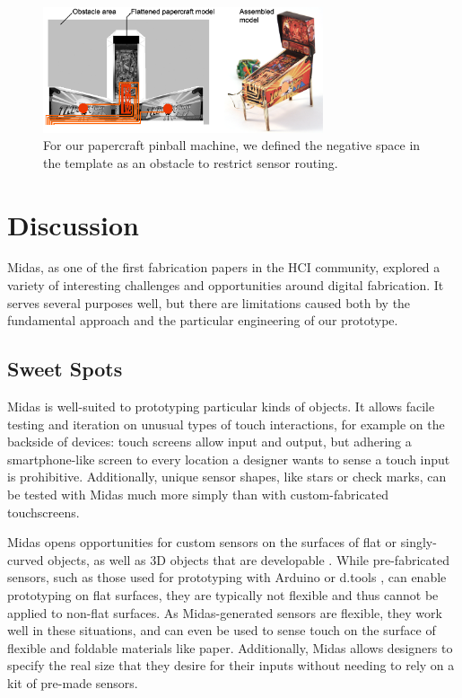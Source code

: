 \begin{figure}
\centering
\includegraphics[width=3.25in]{figures/midas/pinball-horizontal.png}
\caption{For our papercraft pinball machine, we defined the negative space in the template as an obstacle to restrict sensor routing.} 
\label{fig:midas-pinball}
\end{figure}


\section{Discussion}

    Midas, as one of the first fabrication papers in the HCI community, explored a variety of interesting challenges and opportunities around digital fabrication. It serves several purposes well, but there are limitations caused both by the fundamental approach and the particular engineering of our prototype.

    \subsection{Sweet Spots}
    
    Midas is well-suited to prototyping particular kinds of objects. It allows facile testing and iteration on unusual types of touch interactions, for example on the backside of devices: touch screens allow input and output, but adhering a smartphone-like screen to every location a designer wants to sense a touch input is prohibitive. Additionally, unique sensor shapes, like stars or check marks, can be tested with Midas much more simply than with custom-fabricated touchscreens.
    
    Midas opens opportunities for custom sensors on the surfaces of flat or singly-curved objects, as well as 3D objects that are developable \cite{dutton-developable}. While pre-fabricated sensors, such as those used for prototyping with Arduino \cite{arduino} or d.tools \cite{hartmann-dtools}, can enable prototyping on flat surfaces, they are typically not flexible and thus cannot be applied to non-flat surfaces. As Midas-generated sensors are flexible, they work well in these situations, and can even be used to sense touch on the surface of flexible and foldable materials like paper. Additionally, Midas allows designers to specify the real size that they desire for their inputs without needing to rely on a kit of pre-made sensors.

